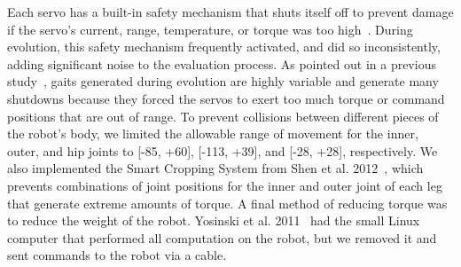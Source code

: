 Each servo has a built-in safety mechanism that shuts itself off to prevent damage if the servo's current, range, temperature, or torque was too high~\cite{robotis}. During evolution, this safety mechanism frequently activated, and did so inconsistently, adding significant noise to the evaluation process. As pointed out in a previous study~\cite{yos:clune},  gaits generated during evolution are highly variable and generate many shutdowns because they forced the servos to exert too much torque or command positions that are out of range. %
To prevent collisions between different pieces of the robot's body, we limited the allowable range of movement for the inner, outer, and hip joints to [-85\degree, +60\degree], [-113\degree, +39\degree], and [-28\degree, +28\degree], respectively. We also implemented the Smart Cropping System from Shen et al. 2012~\cite{haocheng}, which prevents combinations of joint positions for the inner and outer joint of each leg that generate extreme amounts of torque. A final method of reducing torque was to reduce the weight of the robot. Yosinski et al. 2011~\cite{yos:clune} had the small Linux computer that performed all computation on the robot, but we removed it and sent commands to the robot via a cable. 
